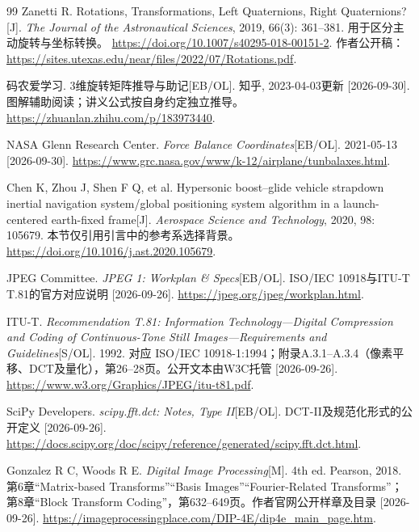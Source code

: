 \documentclass[a4paper,12pt,twoside,openany,fontset=none]{ctexbook}
\newcounter{definition}[chapter]
\numberwithin{equation}{chapter}
\begin{document}
\begin{thebibliography}{99}
Zanetti R. Rotations, Transformations, Left Quaternions, Right Quaternions?[J]. \textit{The Journal of the Astronautical Sciences}, 2019, 66(3): 361--381. 用于区分主动旋转与坐标转换。
\newblock \url{https://doi.org/10.1007/s40295-018-00151-2}.
\newblock 作者公开稿：\url{https://sites.utexas.edu/near/files/2022/07/Rotations.pdf}.

码农爱学习. 3维旋转矩阵推导与助记[EB/OL]. 知乎, 2023-04-03更新 [2026-09-30]. 图解辅助阅读；讲义公式按自身约定独立推导。
\newblock \url{https://zhuanlan.zhihu.com/p/183973440}.

NASA Glenn Research Center. \textit{Force Balance Coordinates}[EB/OL]. 2021-05-13 [2026-09-30].
\newblock \url{https://www.grc.nasa.gov/www/k-12/airplane/tunbalaxes.html}.

Chen K, Zhou J, Shen F Q, et al. Hypersonic boost--glide vehicle strapdown inertial navigation system/global positioning system algorithm in a launch-centered earth-fixed frame[J]. \textit{Aerospace Science and Technology}, 2020, 98: 105679. 本节仅引用引言中的参考系选择背景。
\newblock \url{https://doi.org/10.1016/j.ast.2020.105679}.



JPEG Committee. \textit{JPEG 1: Workplan \& Specs}[EB/OL]. ISO/IEC 10918与ITU-T T.81的官方对应说明 [2026-09-26].
\newblock \url{https://jpeg.org/jpeg/workplan.html}.

ITU-T. \textit{Recommendation T.81: Information Technology---Digital Compression and Coding of Continuous-Tone Still Images---Requirements and Guidelines}[S/OL]. 1992. 对应 ISO/IEC 10918-1:1994；附录A.3.1--A.3.4（像素平移、DCT及量化），第26--28页。公开文本由W3C托管 [2026-09-26].
\newblock \url{https://www.w3.org/Graphics/JPEG/itu-t81.pdf}.

SciPy Developers. \textit{scipy.fft.dct: Notes, Type II}[EB/OL]. DCT-II及规范化形式的公开定义 [2026-09-26].
\newblock \url{https://docs.scipy.org/doc/scipy/reference/generated/scipy.fft.dct.html}.

Gonzalez R C, Woods R E. \textit{Digital Image Processing}[M]. 4th ed. Pearson, 2018. 第6章“Matrix-based Transforms”“Basis Images”“Fourier-Related Transforms”；第8章“Block Transform Coding”，第632--649页。作者官网公开样章及目录 [2026-09-26].
\newblock \url{https://imageprocessingplace.com/DIP-4E/dip4e_main_page.htm}.


\end{thebibliography}
\end{document}
